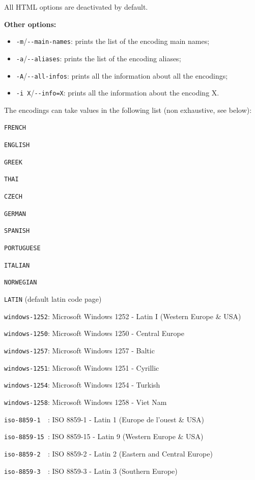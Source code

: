 \noindent All HTML options are deactivated by default.

\bigskip
\noindent \textbf{Other options:}
\begin{itemize}
  \item \verb+-m+/\verb+--main-names+: prints the list of the encoding main
  names;
  \item \verb+-a+/\verb+--aliases+: prints the list of the encoding aliases;
  \item \verb+-A+/\verb+--all-infos+: prints all the information about all the
  encodings;
  \item \verb+-i X+/\verb+--info=X+: prints all the information about the
  encoding X.
\end{itemize}

\bigskip
\noindent The encodings can take values in the following list (non exhaustive,
see below):

\bigskip
\verb$FRENCH$

\verb$ENGLISH$

\verb$GREEK$

\verb$THAI$

\verb$CZECH$

\verb$GERMAN$

\verb$SPANISH$

\verb$PORTUGUESE$

\verb$ITALIAN$

\verb$NORWEGIAN$

\verb$LATIN$ (default latin code page)

\verb$windows-1252$: Microsoft Windows 1252 - Latin I (Western Europe \& USA)

\verb$windows-1250$: Microsoft Windows 1250 - Central Europe

\verb$windows-1257$: Microsoft Windows 1257 - Baltic

\verb$windows-1251$: Microsoft Windows 1251 - Cyrillic

\verb$windows-1254$: Microsoft Windows 1254 - Turkish

\verb$windows-1258$: Microsoft Windows 1258 - Viet Nam

\verb$iso-8859-1  $: ISO 8859-1  - Latin 1 (Europe de l'ouest \& USA)

\verb$iso-8859-15 $: ISO 8859-15 - Latin 9 (Western Europe \& USA)

\verb$iso-8859-2  $: ISO 8859-2  - Latin 2 (Eastern and Central Europe)

\verb$iso-8859-3  $: ISO 8859-3  - Latin 3 (Southern Europe)

